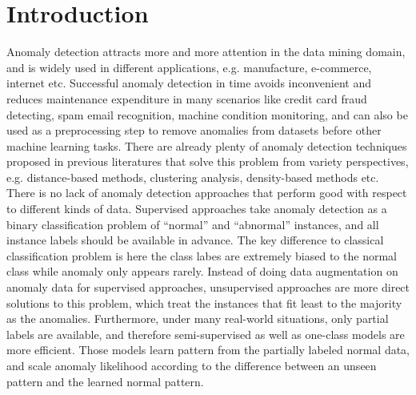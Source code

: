 \chapter{Introduction}
\label{chap:Introduction}

Anomaly detection attracts more and more attention in the data mining domain, and is widely used in different applications, e.g. manufacture, e-commerce, internet etc. Successful anomaly detection in time avoids inconvenient and reduces maintenance expenditure in many scenarios like credit card fraud detecting, spam email recognition, machine condition monitoring, and can also be used as a preprocessing step to remove anomalies from datasets before other machine learning tasks. There are already plenty of anomaly detection techniques proposed in previous literatures that solve this problem from variety perspectives, e.g. distance-based methods, clustering analysis, density-based methods etc.\\

There is no lack of anomaly detection approaches that perform good with respect to different kinds of data. Supervised approaches take anomaly detection as a binary classification problem of “normal” and “abnormal” instances, and all instance labels should be available in advance. The key difference to classical classification problem is here the class labes are extremely biased to the normal class while anomaly only appears rarely. Instead of doing data augmentation on anomaly data for supervised approaches, unsupervised approaches are more direct solutions to this problem, which treat the instances that fit least to the majority as the anomalies. Furthermore, under many real-world situations, only partial labels are available, and therefore semi-supervised as well as one-class models are more efficient. 
Those models learn pattern from the partially labeled normal data, and 
scale anomaly likelihood according to the difference between an unseen pattern and the learned normal pattern.\\

